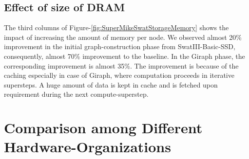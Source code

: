 \documentclass[conference]{IEEEtran}
\begin{document}
\subsection {Effect of size of DRAM} \label{EffectOfDRAM}
The third columns of Figure-\ref{fig:SuperMikeSwatStorageMemory} shows the impact of increasing the amount of memory per node. 
We observed almost 20\% improvement in the initial graph-construction phase from SwatIII-Basic-SSD, consequently, almost 70\% improvement to the baseline. In the Giraph phase, the corresponding improvement is almost 35\%. The improvement is because of the caching especially in case of Giraph, where computation proceeds in iterative supersteps. A huge amount of data is kept in cache and is fetched upon requirement during the next compute-superstep.

\section {Comparison among Different Hardware-Organizations} \label{ComparingDifferentArchitecturalBalance}
\end{document}
